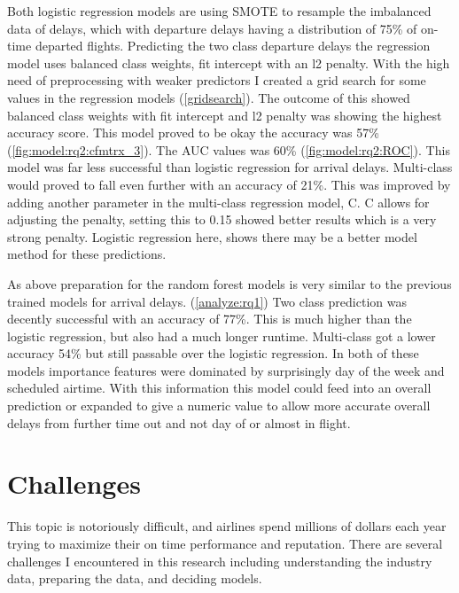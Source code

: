 \documentclass[a4paper,12pt]{article}
\begin{document}
Both logistic regression models are using SMOTE to resample the imbalanced data of delays, which with departure delays having a distribution of 
75\% of on-time departed flights. Predicting the two class departure delays the regression model uses balanced class weights, fit intercept with an l2 penalty.
With the high need of preprocessing with weaker predictors I created a grid search for some values in the regression models (\ref{gridsearch}).
The outcome of this showed balanced class weights with fit intercept and l2 penalty was showing the highest accuracy score. This model proved to be okay the accuracy was 57\% (\ref{fig:model:rq2:cfmtrx_3}).
The AUC values was 60\% (\ref{fig:model:rq2:ROC}). This model was far less successful than logistic regression for arrival delays. Multi-class would proved to fall even further with an accuracy of 21\%.
This was improved by adding another parameter in the multi-class regression model, C. C allows for adjusting the penalty, setting this to 0.15 showed better results which is a very
strong penalty. Logistic regression here, shows there may be a better model method for these predictions.

As above preparation for the random forest models is very similar to the previous trained models for arrival delays. (\ref{analyze:rq1})
Two class prediction was decently successful with an accuracy of 77\%. This is much higher than the logistic regression, but also had a much longer runtime.
Multi-class got a lower accuracy 54\% but still passable over the logistic regression. In both of these models importance features were dominated by surprisingly day of the week 
and scheduled airtime. With this information this model could feed into an overall prediction or expanded to give a numeric value to allow more accurate overall delays from further time out and not 
day of or almost in flight.


\pagebreak

\section{Challenges}

This topic is notoriously difficult, and airlines spend millions of dollars each year trying to maximize their on time performance and reputation.
There are several challenges I encountered in this research including understanding the industry data, preparing the data, and deciding models.
\end{document}
